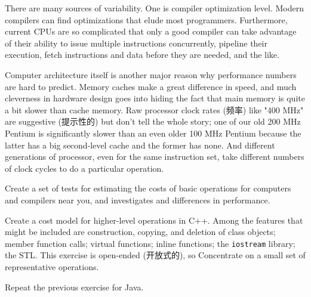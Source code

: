 There are many sources of variability. One is compiler optimization level.
Modern compilers can find optimizations that elude most programmers.
Furthermore, current CPUs are so complicated that only a good compiler can
take advantage of their ability to issue multiple instructions
concurrently, pipeline their execution, fetch instructions and data before
they are needed, and the like.

Computer architecture itself is another major reason why performance
numbers are hard to predict. Memory caches make a great difference in
speed, and much cleverness in hardware design goes into hiding the fact
that main memory is quite a bit slower than cache memory. Raw processor
clock rates (频率) like "400 MHz" are suggestive (提示性的) but don't tell
the whole story; one of our old 200 MHz Pentium is significantly slower
than an even older 100 MHz Pentium because the latter has a big
second-level cache and the former has none. And different generations of
processor, even for the same instruction set, take different numbers of
clock cycles to do a particular operation.

\begin{exercise}
    Create a set of tests for estimating the costs of basic operations for
    computers and compilers near you, and investigates and differences in
    performance.
\end{exercise}

\begin{exercise}
    Create a cost model for higher-level operations in C++. Among the
    features that might be included are construction, copying, and deletion
    of class objects; member function calls; virtual functions; inline
    functions; the \verb'iostream' library; the STL. This exercise is
    open-ended (开放式的), so Concentrate on a small set of representative
    operations.
\end{exercise}

\begin{exercise}
    Repeat the previous exercise for Java.
\end{exercise}
